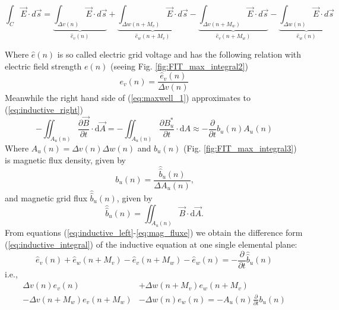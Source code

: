\begin{equation}
\int_{C}\vec{E}\cdot d\vec{s}
=\underbrace{\int_{\Delta v(n)}\vec{E}\cdot d\vec{s}}_{\widehat{e}_{v}(n)}
+\underbrace{\int_{\Delta w(n+M_{v})}\vec{E}\cdot d\vec{s}}_{\widehat{e}_{w}(n+M_{v})}
-\underbrace{\int_{\Delta v(n+M_{w})}\vec{E}\cdot d\vec{s}}_{\widehat{e}_{v}(n+M_{w})}
-\underbrace{\int_{\Delta w(n)}\vec{E}\cdot d\vec{s}}_{\widehat{e}_{w}(n)}
\label{eq:inductive_left}
\end{equation}

Where $\widehat{e}(n)$ is so called  electric grid voltage and has the following relation with electric field strength $e(n)$ (seeing Fig. \ref{fig:FIT_max_integral2})
\begin{equation}
 e_{v}(n)=\frac{\widehat{e}_{v}(n)}{\Delta v(n)}
\label{eq:e_field}
\end{equation}
Meanwhile the right hand side of (\ref{eq:maxwell_1}) approximates to (\ref{eq:inductive_right})
\begin{equation}
-\iint_{A_{u}(n)}\frac{\partial\vec{B}}{\partial t}\cdot\mathrm{d}\vec{A} 
=-\iint_{A_{u}(n)}\frac{\partial B^{*}_{u}}{\partial t}\cdot\mathrm{d}A
\approx -\frac{\partial}{\partial t}b_{u}(n)A_{u}(n)
\label{eq:inductive_right}
\end{equation}
Where $A_{u}(n)=\Delta v(n)\Delta w(n)$ and $b_{u}(n)$ (Fig. \ref{fig:FIT_max_integral3}) is magnetic flux density, given by
\begin{equation}
 b_{u}(n)=\frac{\widehat{\widehat{b}}_{u}(n)}{\Delta A_{u}(n)} \text{,}
\label{eq:b_flux_density}
\end{equation}
 and magnetic grid flux $\widehat{\widehat{b}}_{u}(n)$, given by
\begin{equation}
\widehat{\widehat{b}}_{u}(n)=\iint_{A_{u}(n)}\vec{B}\cdot\mathrm{d}\vec{A} \text{.}
\label{eq:mag_fluxe}
\end{equation}
From equations (\ref{eq:inductive_left}-\ref{eq:mag_fluxe}) we obtain the difference form (\ref{eq:inductive_integral}) of the inductive equation at one single elemental plane:
\begin{equation}
\widehat{e}_{v}(n)+\widehat{e}_{w}(n+M_{v})-\widehat{e}_{v}(n+M_{w})-\widehat{e}_{w}(n)=-\frac{\partial}{\partial t}\widehat{\widehat{b}}_{u}(n)
\label{eq:inductive_integral}
\end{equation}
i.e.,
\begin{align}
\Delta v(n)e_{v}(n)&+\Delta w(n+M_{v})e_{w}(n+M_{v})\nonumber\\
-\Delta v(n+M_{w})e_{v}(n+M_{w})&-\Delta w(n)e_{w}(n)=-A_{u}(n)\frac{\partial}{\partial{t}}b_{u}(n) 
\label{eq:inductive_sample}
\end{align}
